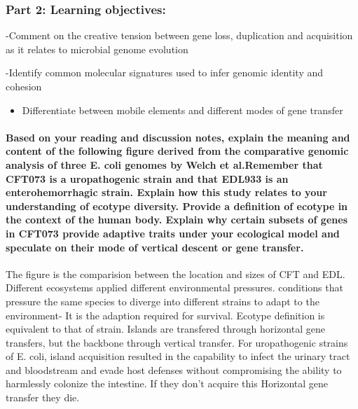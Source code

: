 \documentclass[]{article}
\providecommand{\tightlist}{%
  \setlength{\itemsep}{0pt}\setlength{\parskip}{0pt}}
\let\oldparagraph\paragraph
\renewcommand{\paragraph}[1]{\oldparagraph{#1}\mbox{}}
\begin{document}
\subsubsection{Part 2: Learning
objectives:}\label{part-2-learning-objectives}

-Comment on the creative tension between gene loss, duplication and
acquisition as it relates to microbial genome evolution

-Identify common molecular signatures used to infer genomic identity and
cohesion

\begin{itemize}
\tightlist
\item
  Differentiate between mobile elements and different modes of gene
  transfer
\end{itemize}

\paragraph{Based on your reading and discussion notes, explain the
meaning and content of the following figure derived from the comparative
genomic analysis of three E. coli genomes by Welch et al.Remember that
CFT073 is a uropathogenic strain and that EDL933 is an enterohemorrhagic
strain. Explain how this study relates to your understanding of ecotype
diversity. Provide a definition of ecotype in the context of the human
body. Explain why certain subsets of genes in CFT073 provide adaptive
traits under your ecological model and speculate on their mode of
vertical descent or gene
transfer.}\label{based-on-your-reading-and-discussion-notes-explain-the-meaning-and-content-of-the-following-figure-derived-from-the-comparative-genomic-analysis-of-three-e.-coli-genomes-by-welch-et-al.remember-that-cft073-is-a-uropathogenic-strain-and-that-edl933-is-an-enterohemorrhagic-strain.-explain-how-this-study-relates-to-your-understanding-of-ecotype-diversity.-provide-a-definition-of-ecotype-in-the-context-of-the-human-body.-explain-why-certain-subsets-of-genes-in-cft073-provide-adaptive-traits-under-your-ecological-model-and-speculate-on-their-mode-of-vertical-descent-or-gene-transfer.}

The figure is the comparision between the location and sizes of CFT and
EDL. Different ecosystems applied different environmental pressures.
conditions that pressure the same species to diverge into different
strains to adapt to the environment- It is the adaption required for
survival. Ecotype definition is equivalent to that of strain. Islands
are transfered through horizontal gene transfers, but the backbone
through vertical transfer. For uropathogenic strains of E. coli, island
acquisition resulted in the capability to infect the urinary tract and
bloodstream and evade host defenses without compromising the ability to
harmlessly colonize the intestine. If they don't acquire this Horizontal
gene transfer they die.
\end{document}
